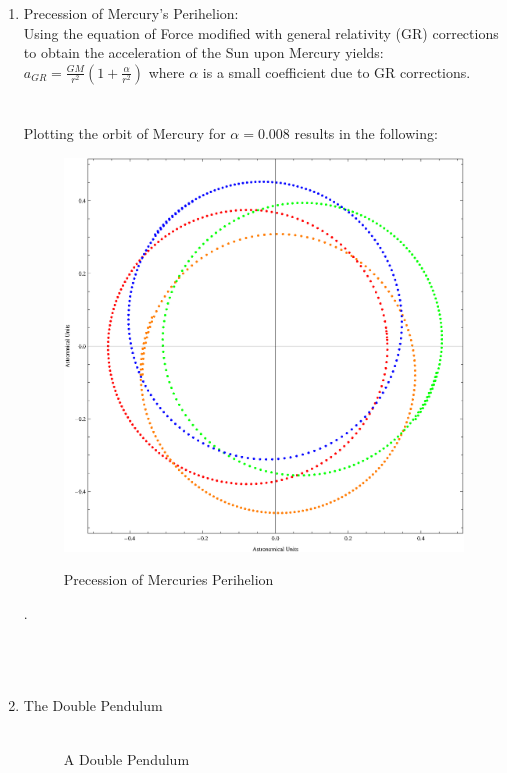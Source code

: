 \documentclass{report}
\begin{document}
\begin{enumerate}
\begin{figure}[H]
\label{fatEarth}
\end{figure}
.
\item Precession of Mercury's Perihelion:
\\

Using the equation of Force modified with general relativity (GR) corrections to obtain the acceleration of the Sun upon Mercury yields: $\displaystyle a_{GR} = \frac{GM}{r^2}(1+\frac{\alpha}{r^2})$ where $\alpha$ is a small coefficient due to GR corrections.
\\
\\
\\Plotting the orbit of Mercury for $\alpha=0.008$ results in the following:
\\
\begin{figure}[H]
\centering \caption{Precession of Mercuries Perihelion}
\includegraphics[scale=.75]{precession.eps}
\label{fatEarth}
\end{figure}
.
\\
\\
\\
\\
\item The Double Pendulum
\\
\\\begin{figure}[H]
\centering \caption{A Double Pendulum}

\end{figure}
\end{enumerate}
\end{document}

